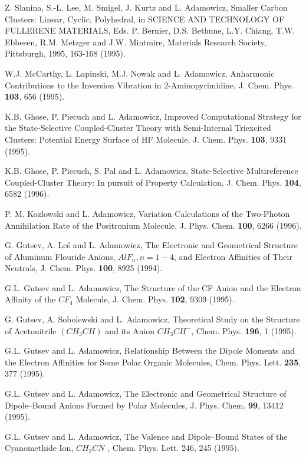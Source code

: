 \begin{thebibliography}{999}
Z. Slanina, S.-L. Lee, M. Smigel, J. Kurtz and 
L. Adamowicz, Smaller Carbon Clusters: Linear, Cyclic,
Polyhedral, in SCIENCE AND TECHNOLOGY OF 
FULLERENE MATERIALS, Eds. P. Bernier, D.S.
Bethune, L.Y. Chiang, T.W. Ebbesen, 
R.M. Metzger and J.W. Mintmire, Materials Research Society,
Pittsburgh, 1995, 163-168 (1995).

W.J. McCarthy, L. Lapinski, M.J. Nowak and 
L. Adamowicz, Anharmonic Contributions to the
Inversion Vibration in 2-Aminopyrimidine, 
J. Chem. Phys. {\bf 103}, 656 (1995).

K.B. Ghose, P. Piecuch and L. Adamowicz, 
Improved Computational Strategy for the State-Selective
Coupled-Cluster Theory with Semi-Internal Triexcited Clusters:  
Potential Energy Surface of HF
Molecule, J. Chem. Phys. {\bf 103}, 9331 (1995).

K.B. Ghose, P. Piecuch, S. Pal and L. Adamowicz, 
State-Selective Multireference Coupled-Cluster
Theory:  In pursuit of Property Calculation, 
J. Chem. Phys. {\bf 104}, 6582 (1996).

P. M. Kozlowski and L. Adamowicz, Variation 
Calculations of the Two-Photon Annihilation Rate of the
Positronium Molecule, J. Phys. Chem. {\bf 100}, 6266 (1996).

G. Gutsev, A. Le\'{s} and L. Adamowicz, The Electronic 
and Geometrical Structure of Aluminum Flouride
Anions, $AlF_n, n = 1-4$, and Electron Affinities of 
Their Neutrals, J. Chem. Phys. {\bf 100}, 8925 (1994).

G.L. Gutsev and L. Adamowicz, The Structure of 
the CF Anion and the Electron Affinity of the $CF_4$
Molecule, J. Chem. Phys. {\bf 102}, 9309 (1995).

G. Gutsev, A. Sobolewski and L. Adamowicz, 
Theoretical Study on the Structure of Acetonitrile
$(CH_3CH)$ and its Anion $CH_3CH^-$, Chem. Phys. 
{\bf 196}, 1 (1995).

G.L. Gutsev and L. Adamowicz, Relationship Between 
the Dipole Moments and the Electron Affinities
for Some Polar Organic Molecules, Chem. Phys. Lett. {\bf 235}, 
377 (1995).

G.L. Gutsev and L. Adamowicz, The Electronic and 
Geometrical Structure of Dipole--Bound Anions
Formed by Polar Molecules, J. Phys. Chem. 
{\bf 99}, 13412 (1995).

G.L. Gutsev and L. Adamowicz, The Valence and 
Dipole--Bound States of the Cyanomethide Ion,
$CH_2CN$ , Chem. Phys. Lett. 246, 245 (1995).


\end{thebibliography}
